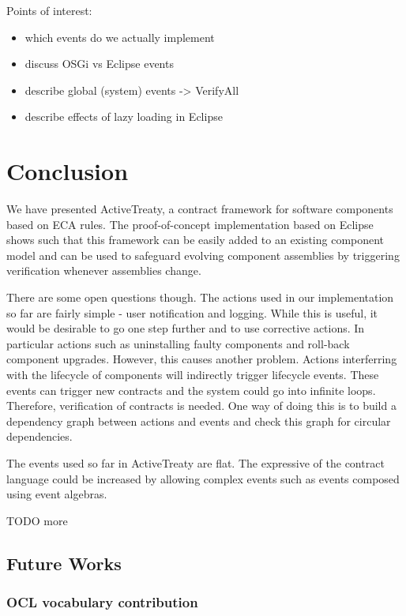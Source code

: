 \documentclass{llncs}
\begin{document}
Points of interest:

\begin{itemize}
	\item which events do we actually implement
  \item discuss OSGi vs Eclipse events
  \item describe global (system) events -> VerifyAll
  \item describe effects of lazy loading in Eclipse
\end{itemize}


\section{Conclusion}

We have presented ActiveTreaty, a contract framework for software components based on ECA rules. The proof-of-concept implementation based on Eclipse shows such that this framework can be easily added to an existing component model and can be used to safeguard evolving component assemblies by triggering verification whenever assemblies change. 

There are some open questions though. The actions used in our implementation so far are fairly simple - user notification and logging. While this is useful, it would be desirable to go one step further and to use corrective actions.  In particular actions such as uninstalling faulty components and roll-back component upgrades. However, this causes another problem. Actions interferring with the lifecycle of components will indirectly trigger lifecycle events. These events can trigger new contracts and the system could go into infinite loops. Therefore, verification of contracts is needed. One way of doing this is to build a dependency graph between actions and events and check this graph for circular dependencies. 

The events used so far in ActiveTreaty are flat. The expressive of the contract language could be increased by allowing complex events such as events composed using event algebras. 

TODO more

\subsection{Future Works}

\subsubsection{OCL vocabulary contribution}
\end{document}
